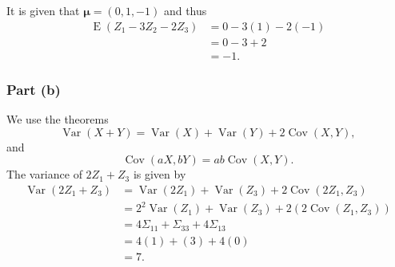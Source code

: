 \documentclass[
]{article}
\begin{document}
It is given that \(\bm{\mu} = (0,1,-1)\) and thus \begin{align*}
   \operatorname{E}(Z_1 - 3 Z_2 - 2 Z_3) &= 0 - 3(1) - 2(-1)\\
      &= 0 - 3 + 2\\
      &= -1.
\end{align*}

\hypertarget{part-b}{%
\subsubsection{Part (b)}\label{part-b}}


We use the theorems \[
   \operatorname{Var}(X+Y) = \operatorname{Var}(X) + \operatorname{Var}(Y) + 2 \operatorname{Cov}(X,Y),
\] and \[
   \operatorname{Cov}(a X, b Y) = a b \operatorname{Cov}(X,Y).
\] The variance of \(2 Z_1 + Z_3\) is given by \begin{align*}
   \operatorname{Var}(2 Z_1 + Z_3)
      &= \operatorname{Var}(2 Z_1) + \operatorname{Var}(Z_3) + 2 \operatorname{Cov}(2 Z_1,Z_3)\\
      &= 2^2 \operatorname{Var}(Z_1) + \operatorname{Var}(Z_3) + 2 \left(2 \operatorname{Cov}(Z_1,Z_3)\right)\\
      &= 4 \Sigma_{1 1} + \Sigma_{3 3} + 4 \Sigma_{1 3}\\
      &= 4(1) + (3) + 4(0)\\
      &= 7.
\end{align*}

\end{document}
